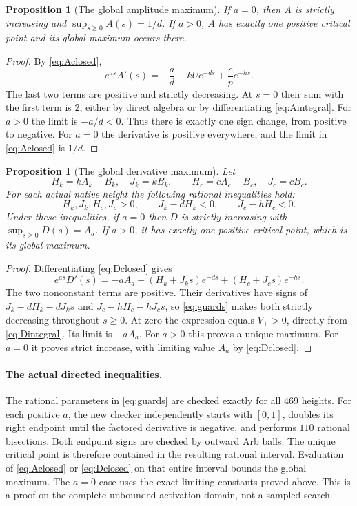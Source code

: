 \documentclass[11pt,a4paper]{article}
\newtheorem{proposition}[theorem]{Proposition}
\theoremstyle{definition}
\theoremstyle{remark}
\begin{document}
\begin{proposition}[The global amplitude maximum]\label{prop:A}
If $a=0$, then $A$ is strictly increasing and
$\sup_{s\ge0}A(s)=1/d$. If $a>0$, $A$ has exactly one positive
critical point and its global maximum occurs there.
\end{proposition}
\begin{proof}
By \eqref{eq:Aclosed},
\[
 e^{as}A'(s)=-\frac ad+kUe^{-ds}+\frac cp e^{-hs}.
\]
The last two terms are positive and strictly decreasing. At $s=0$
their sum with the first term is $2$, either by direct algebra or by
differentiating \eqref{eq:Aintegral}. For $a>0$ the limit is $-a/d<0$.
Thus there is exactly one sign change, from positive to negative.
For $a=0$ the derivative is positive everywhere, and the limit in
\eqref{eq:Aclosed} is $1/d$.
\end{proof}

\begin{proposition}[The global derivative maximum]\label{prop:D}
Let
\[
 H_k=kA_k-B_k,\quad J_k=kB_k,\qquad
 H_c=cA_c-B_c,\quad J_c=cB_c.
\]
For each actual native height the following rational inequalities hold:
\begin{equation}\label{eq:guards}
 H_k,J_k,H_c,J_c>0,\qquad
 J_k-dH_k<0,\qquad J_c-hH_c<0.
\end{equation}
Under these inequalities, if $a=0$ then $D$ is strictly increasing with
$\sup_{s\ge0}D(s)=A_a$. If $a>0$, it has exactly one positive critical
point, which is its global maximum.
\end{proposition}
\begin{proof}
Differentiating \eqref{eq:Dclosed} gives
\[
 e^{as}D'(s)=-aA_a+(H_k+J_k s)e^{-ds}
                         +(H_c+J_c s)e^{-hs}.
\]
The two nonconstant terms are positive. Their derivatives have signs
of $J_k-dH_k-dJ_k s$ and $J_c-hH_c-hJ_c s$, so
\eqref{eq:guards} makes both strictly decreasing throughout $s\ge0$.
At zero the expression equals $V_+>0$, directly from
\eqref{eq:Dintegral}. Its limit is $-aA_a$.
For $a>0$ this proves a unique maximum. For $a=0$ it proves strict
increase, with limiting value $A_a$ by \eqref{eq:Dclosed}.
\end{proof}

\paragraph{The actual directed inequalities.}
The rational parameters in \eqref{eq:guards} are checked exactly for
all $469$ heights. For each positive $a$, the new checker independently
starts with $[0,1]$, doubles its right endpoint until the factored
derivative is negative, and performs $110$ rational bisections. Both
endpoint signs are checked by outward Arb balls. The unique critical
point is therefore contained in the resulting rational interval.
Evaluation of \eqref{eq:Aclosed} or \eqref{eq:Dclosed} on that entire
interval bounds the global maximum. The $a=0$ case uses the exact
limiting constants proved above. This is a proof on the complete
unbounded activation domain, not a sampled search.
\end{document}
